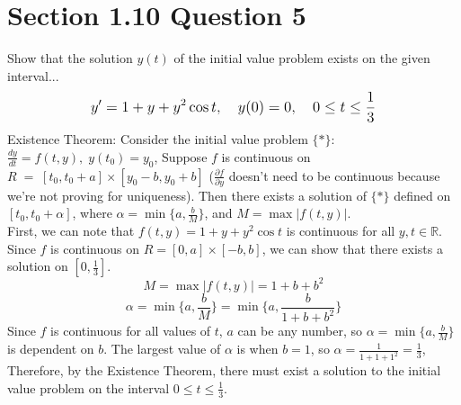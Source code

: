 \documentclass[11pt]{article}
\begin{document}
 \section*{Section 1.10 Question 5}
 Show that the solution $y(t)$ of the initial value problem exists on the given
 interval... 
 $$\mathlarger{y' = 1 + y + y^2\cos t, \quad y(0) = 0, \quad 0 \leq t \leq \frac{1}{3}}$$
 Existence Theorem: Consider the initial value problem $\{*\}$: 
 $\frac{dy}{dt} = f(t,y), \; y(t_0) = y_0$,
 Suppose $f$ is continuous on $R \;=\; [t_0,t_0+a] \times [y_0-b,y_0+b]$
 ($\frac{\partial f}{\partial y}$ doesn't need to be continuous because we're not 
 proving for uniqueness).  Then there exists a solution of $\{*\}$ defined on 
 $[t_0,t_0+\alpha]$, where $\alpha = \min \{a,\frac{b}{M}\}$, and 
 $M = \max |f(t,y)|$. \\

 First, we can note that $f(t,y) = 1+y+y^2\cos t$ is continuous for all $y,t \in \mathbb{R}$.
 Since $f$ is continuous on $R = [0,a] \times [-b,b]$, we can show that there exists a solution
 on $[0,\frac{1}{3}]$.
 $$M = \max |f(t,y)| = 1 + b + b^2$$
 $$\alpha = \min \Big\{a,\frac{b}{M}\Big\} = \min \Big\{a,\frac{b}{1+b+b^2}\Big\}$$
 Since $f$ is continuous for all values of $t$, $a$ can be any number, so 
 $\alpha = \min \Big\{a,\frac{b}{M}\Big\}$ is dependent on $b$.
 The largest value of $\alpha$ is when $b = 1$, so $\alpha = \frac{1}{1+1+1^2} = \frac{1}{3}$,
 Therefore, by the Existence Theorem, there must exist a solution to the initial value problem
 on the interval $0 \leq t \leq \frac{1}{3}$.
\end{document}
